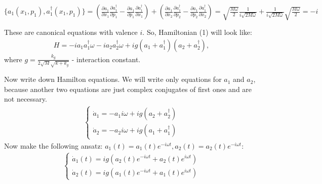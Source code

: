 \documentclass[%
aps, pra,
amsmath,amssymb,
reprint,%
superscriptaddress
]{revtex4-2}
\begin{document}
$\{a_1(x_1, p_1), a_1^\dag(x_1, p_1)\}=\left(\frac{\partial a_1}{\partial x_1} \frac{\partial a_1^\dag}{\partial p_1} - \frac{\partial a_1}{\partial p_1} \frac{\partial a_1^\dag}{\partial x_1}\right) + \left(\frac{\partial a_1}{\partial x_2} \frac{\partial a_1^\dag}{\partial p_2} - \frac{\partial a_1}{\partial p_2} \frac{\partial a_1^\dag}{\partial x_2} \right) = \sqrt{\frac{M\omega}{2}} \frac{1}{i\sqrt{2M\omega}}+\frac{1}{i \sqrt{2M \omega}} \sqrt{\frac{M \omega}{2}}=-i$\newline

These are canonical equations with valence $i$.
So, Hamiltonian (1) will look like:
\begin{align*}
	H=-i a_1 a_1^\dag \omega - i a_2 a_2^\dag \omega + ig(a_1+a_1^\dag)(a_2+a_2^\dag),
\end{align*}
where $g = \frac{k_g}{2\sqrt{M}\sqrt{k+k_g}}$ - interaction constant.\newline

Now write down Hamilton equations. We will write only equations for $a_1$ and $a_2$, because another two equations are just complex conjugates of first ones and are not necessary.
\begin{align*}
	\begin{cases}
		\dot a_1 = -a_1 i \omega + ig(a_2 + a_2^\dag)
		\\
		\dot a_2 = -a_2 i \omega + ig(a_1 + a_1^\dag)
	\end{cases}
\end{align*}
Now make the following ansatz: $a_1(t) = a_1(t)e^{-i\omega t}, a_2(t) = a_2(t)e^{-i\omega t}$:
\begin{align*}
	\begin{cases}
		\dot a_1(t) = ig(a_2(t)e^{-i\omega t} + a_2(t)e^{i\omega t})
		\\
		\dot a_2(t) = ig(a_1(t)e^{-i\omega t} + a_1(t)e^{i\omega t})
	\end{cases}
\end{align*}
\end{document}
